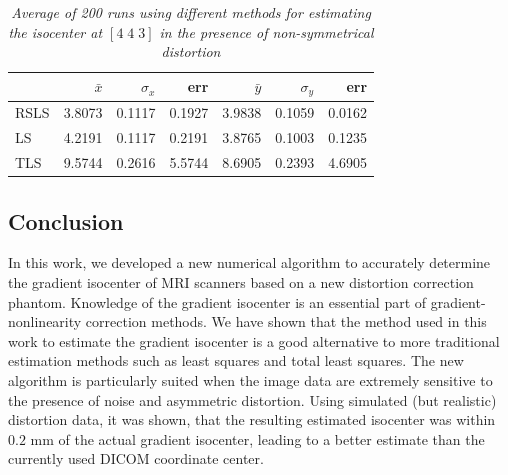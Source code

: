 \begin{table}
  \begin{tabular} {| l | r | r | r | r | r | r |}
    \hline
    & $\bar{x}$ & $\sigma_x$ & err & $\bar{y}$ & $\sigma_y$ & err \\
    \hline
    RSLS & 3.8073 & 0.1117 & 0.1927   & 3.9838 & 0.1059 & 0.0162 \\
    \hline
    LS  & 4.2191 & 0.1117    & 0.2191 & 3.8765 & 0.1003 & 0.1235 \\
    \hline
    TLS  & 9.5744 & 0.2616 & 5.5744   & 8.6905 & 0.2393 & 4.6905 \\
    \hline
  \end{tabular}
  \caption{\emph{Average of 200 runs using different methods for estimating the isocenter at $[4 \; 4 \; 3]$ in the presence of non-symmetrical distortion }} \label{table:nonsymmetric}
\end{table}


\subsection{Conclusion}
In this work, we developed a new numerical algorithm to accurately determine the gradient isocenter
of MRI scanners based on a new distortion correction phantom. Knowledge of the gradient isocenter is an essential part of gradient-nonlinearity correction methods.  We have shown that the method used in this work to estimate the gradient isocenter is a good alternative to more traditional estimation methods such as least squares and total least squares. The new algorithm is particularly suited when the image data are extremely sensitive to the presence of noise and asymmetric distortion. Using simulated (but realistic) distortion data, it was shown, that the resulting estimated isocenter was within $0.2$ mm of the actual gradient isocenter, leading to a better estimate than the currently used DICOM coordinate center.
